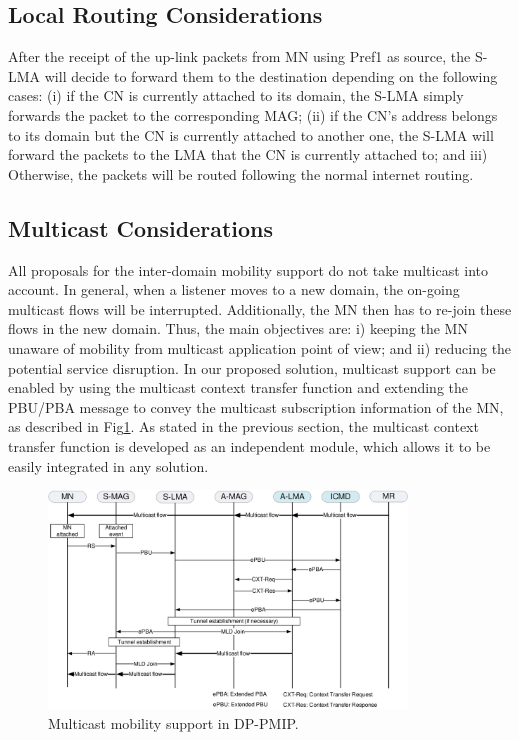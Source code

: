 \subsection{Local Routing Considerations}
After the receipt of the up-link packets from MN using Pref1 as source, the S-LMA will decide to forward them to the destination depending on the following cases: (i) if the CN is currently attached to its domain, the S-LMA simply forwards the packet to the corresponding MAG; (ii) if the CN's address belongs to its domain but the CN is currently attached to another one, the S-LMA will forward the packets to the LMA that the CN is currently attached to; and iii) Otherwise, the packets will be routed following the normal internet routing. 
\subsection{Multicast Considerations}
All proposals for the inter-domain mobility support do not take multicast into account. In general, when a listener moves to a new domain, the on-going multicast flows will be interrupted. Additionally, the MN then has to re-join these flows in the new domain. Thus, the main objectives are: i) keeping the MN unaware of mobility from multicast application point of view; and ii) reducing the potential service disruption. 
In our proposed solution, multicast support can be enabled by using the multicast context transfer function and extending the PBU/PBA message to convey the multicast subscription information of the MN, as described in Fig\ref{fig:c9_multicast_signaling}. As stated in the previous section, the multicast context transfer function is developed as an independent module, which allows it to be easily integrated in any solution. 
\begin{figure}[h!]
\centering
\includegraphics[width=0.85\textwidth]{./Part3/Chapter7/figures/c9_multicast_signaling.eps}
\caption[Multicast mobility support in the inter-domain mobility solution.]{Multicast mobility support in DP-PMIP.}
\label{fig:c9_multicast_signaling}
\end{figure}
